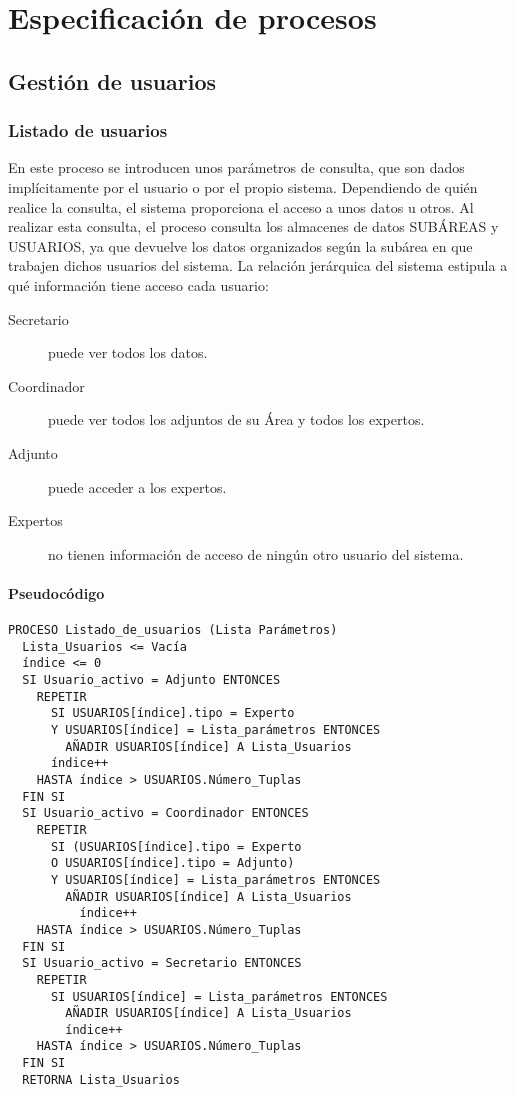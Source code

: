 \documentclass[12pt,a4paper,spanish,twoside]{book}
\begin{document}
\chapter{Especificación de procesos}
\section{Gestión de usuarios}
\subsection{Listado de usuarios}
En este proceso se introducen unos parámetros de consulta, que son dados
implícitamente por el usuario o por el propio sistema. Dependiendo de quién
realice la consulta, el sistema proporciona el acceso a unos datos u
otros. Al realizar esta consulta, el proceso consulta los almacenes de datos
SUBÁREAS y USUARIOS, ya que devuelve los datos organizados según la subárea
en que trabajen dichos usuarios del sistema. La relación jerárquica del
sistema estipula a qué información tiene acceso cada usuario:

\begin{description}
\item[Secretario] puede ver todos los datos.
\item[Coordinador] puede ver todos los adjuntos de su Área y todos los
  expertos.
\item[Adjunto] puede acceder a los expertos.
\item[Expertos] no tienen información de acceso de ningún otro usuario del 
sistema.
\end{description}

\subsubsection{Pseudocódigo}
\begin{lstlisting}[inputencoding=utf8/latin1]
PROCESO Listado_de_usuarios (Lista Parámetros)
  Lista_Usuarios <= Vacía
  índice <= 0
  SI Usuario_activo = Adjunto ENTONCES
    REPETIR
      SI USUARIOS[índice].tipo = Experto
      Y USUARIOS[índice] = Lista_parámetros ENTONCES
        AÑADIR USUARIOS[índice] A Lista_Usuarios
      índice++
    HASTA índice > USUARIOS.Número_Tuplas
  FIN SI
  SI Usuario_activo = Coordinador ENTONCES
    REPETIR
      SI (USUARIOS[índice].tipo = Experto
      O USUARIOS[índice].tipo = Adjunto)
      Y USUARIOS[índice] = Lista_parámetros ENTONCES
        AÑADIR USUARIOS[índice] A Lista_Usuarios
	      índice++
    HASTA índice > USUARIOS.Número_Tuplas
  FIN SI
  SI Usuario_activo = Secretario ENTONCES
    REPETIR
      SI USUARIOS[índice] = Lista_parámetros ENTONCES
        AÑADIR USUARIOS[índice] A Lista_Usuarios
        índice++
    HASTA índice > USUARIOS.Número_Tuplas
  FIN SI
  RETORNA Lista_Usuarios

\end{lstlisting}
\end{document}

